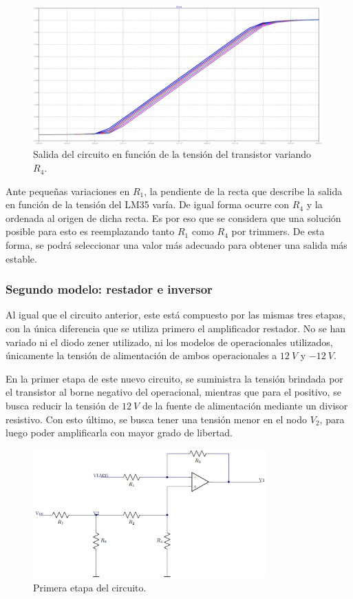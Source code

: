 \documentclass[a4paper]{article}
\begin{document}
\begin{figure}[H]
	\centering
	\includegraphics[width=0.99\textwidth]{Ejercicio6/Imagenes/StepR4-M1.png}
	\caption{Salida del circuito en función de la tensión del transistor variando $R_4$.}
	\label{fig:r4-M1}
\end{figure}

Ante pequeñas variaciones en $R_1$, la pendiente de la recta que describe la salida en función de la tensión del LM35 varía. De igual forma ocurre con $R_4$ y la ordenada al origen de dicha recta. Es por eso que se considera que una solución posible para esto es reemplazando tanto $R_1$ como $R_4$ por trimmers. De esta forma, se podrá seleccionar una valor más adecuado para obtener una salida más estable.

\subsubsection{Segundo modelo: restador e inversor}

Al igual que el circuito anterior, este está compuesto por las mismas tres etapas, con la única diferencia que se utiliza primero el amplificador restador. No se han variado ni el diodo zener utilizado, ni los modelos de operacionales utilizados, únicamente la tensión de alimentación de ambos operacionales a $12 \ V$ y $-12 \ V$.

En la primer etapa de este nuevo circuito, se suministra la tensión brindada por el transistor al borne negativo del operacional, mientras que para el positivo, se busca reducir la tensión de $12 \ V$ de la fuente de alimentación mediante un divisor resistivo. Con esto último, se busca tener una tensión menor en el nodo $V_2$, para luego poder amplificarla con mayor grado de libertad.

\begin{figure}[H]
	\centering
	\includegraphics[width=0.8\textwidth]{Ejercicio6/Imagenes/CircuitoEtapa1-M2.png}
\caption{Primera etapa del circuito.}
	\label{fig:cir1-M2}
\end{figure}
\end{document}
